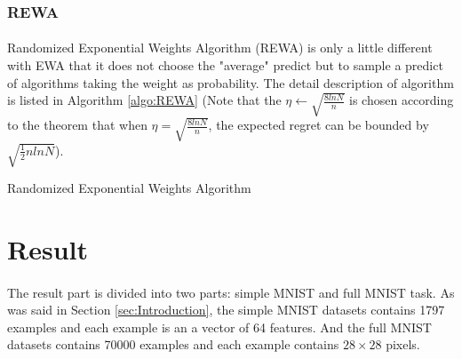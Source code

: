 \documentclass{gapd}
\begin{document}
\subsubsection{REWA}
\paragraph{}

	Randomized Exponential Weights Algorithm (REWA) is only a little different with EWA that it does not choose the "average" predict but to sample a predict of algorithms taking the weight as probability. The detail description of algorithm is listed in Algorithm \ref{algo:REWA} (Note that the $\eta \gets \sqrt{\frac{8lnN}{n}} $ is chosen according to the theorem that when $\eta = \sqrt{\frac{8lnN}{n}} $, the expected regret can be bounded by $\sqrt{\frac12nlnN}$). 

\begin{algorithm}[htb]
\caption{Randomized Exponential Weights Algorithm}
\label{algo:REWA}
\begin{algorithmic}
\EndFor
{}
\EndFor
\EndFor
\end{algorithmic}
\end{algorithm}



\section{Result}
\label{sec:Result}
\paragraph{}
	\lettrine{T}{}he result part is divided into two parts: simple MNIST and full MNIST task. As was said in Section \ref{sec:Introduction}, the simple MNIST datasets contains 1797 examples and each example is an a vector of 64 features. And the full MNIST datasets contains 70000 examples and each example contains $28 \times 28$ pixels. 
	
\end{document}
